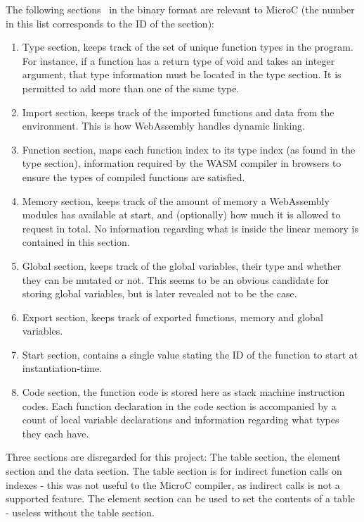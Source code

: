 \documentclass[a4paper]{article}
\begin{document}
The following sections~\cite{website:wasm-modules} in the binary format are relevant to MicroC (the number in this list corresponds to the ID of the section):
\begin{enumerate}
	\item Type section, keeps track of the set of unique function types in the program. For instance, if a function has a return type of void and takes an integer argument, that type information must be located in the type section. It is permitted to add more than one of the same type.
	\item Import section, keeps track of the imported functions and data from the environment. This is how WebAssembly handles dynamic linking.
	\item Function section, maps each function index to its type index (as found in the type section), information required by the WASM compiler in browsers to ensure the types of compiled functions are satisfied.
	\setcounter{enumi}{4}
	\item Memory section, keeps track of the amount of memory a WebAssembly modules has available at start, and (optionally) how much it is allowed to request in total. No information regarding what is inside the linear memory is contained in this section.
	\item Global section, keeps track of the global variables, their type and whether they can be mutated or not. This seems to be an obvious candidate for storing global variables, but is later revealed not to be the case.
	\item Export section, keeps track of exported functions, memory and global variables.
	\item Start section, contains a single value stating the ID of the function to start at instantiation-time.
	\setcounter{enumi}{9}
	\item Code section, the function code is stored here as stack machine instruction codes. Each function declaration in the code section is accompanied by a count of local variable declarations and information regarding what types they each have.
\end{enumerate}

Three sections are disregarded for this project: The table section, the element section and the data section. The table section is for indirect function calls on indexes - this was not useful to the MicroC compiler, as indirect calls is not a supported feature. The element section can be used to set the contents of a table - useless without the table section.
\end{document}
